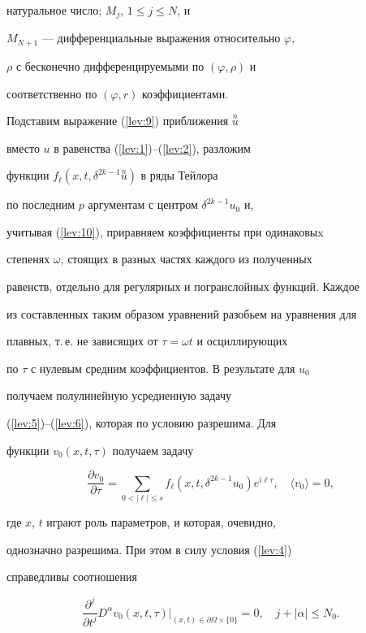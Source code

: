 натуральное число; $M_j$, $1\leqslant j\leqslant N$, и


$M_{N+1}$ --- дифференциальные выражения относительно $\varphi$,


$\rho$ с бесконечно дифференцируемыми по $(\varphi,\rho)$ и


соответственно по $(\varphi,r)$ коэффициентами.





Подставим выражение (\ref{lev:9}) приближения $\overset{n}{u}{}$


вместо $u$ в равенства (\ref{lev:1})--(\ref{lev:2}), разложим


функции $f_\ell(x,t,\delta^{2k-1}\overset{n}{u}){}$ в ряды Тейлора


по последним $p$ аргументам с центром $\delta^{2k-1}u_0$ и,


учитывая (\ref{lev:10}), приравняем коэффициенты при одинаковыx


степенях $\omega$, стоящих в разных частях каждого из полученных


равенств, отдельно для регулярных и погранслойных функций. Каждое


из составленных таким образом уравнений разобьем на уравнения для


плавных, т.\,е. не зависящих от $\tau=\omega t$ и осциллирующих


по $\tau$ с нулевым средним коэффициентов. В результате для $u_0$


получаем полулинейную усредненную задачу


(\ref{lev:5})--(\ref{lev:6}), которая по условию разрешима. Для


функции $v_0(x,t,\tau)$ получаем задачу


$$


\frac{\partial v_0}{\partial\tau}=\sum_{0<|\ell|\leqslant s}


f_\ell(x,t,\delta^{2k-1}u_0)e^{i\ell\tau},\quad


\langle v_0\rangle=0,


$$


где $x$, $t$ играют роль параметров, и которая, очевидно,


однозначно разрешима. При этом в силу условия (\ref{lev:4})


справедливы соотношения


\begin{equation}\label{lev:11}


\frac{\partial^j}{\partial t^j}D^\alpha v_0(x,t,\tau)


\Big|_{(x,t)\in \partial\Omega\times\{0\}}=0,\quad


j+|\alpha|\leqslant N_0.


\end{equation}






